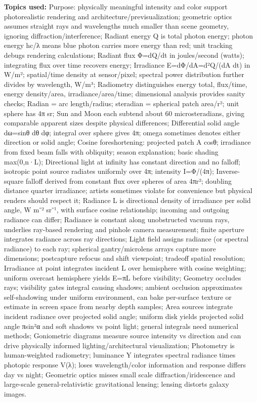 \textbf{Topics used:} Purpose: physically meaningful intensity and color support photorealistic rendering and architecture/previsualization; geometric optics assumes straight rays and wavelengths much smaller than scene geometry, ignoring diffraction/interference; Radiant energy Q is total photon energy; photon energy hc/λ means blue photon carries more energy than red; unit tracking debugs rendering calculations; Radiant flux Φ=dQ/dt in joules/second (watts); integrating flux over time recovers energy; Irradiance E=dΦ/dA=d²Q/(dA dt) in W/m²; spatial/time density at sensor/pixel; spectral power distribution further divides by wavelength, W/m³; Radiometry distinguishes energy total, flux/time, energy density/area, irradiance/area/time; dimensional analysis provides sanity checks; Radian = arc length/radius; steradian = spherical patch area/r²; unit sphere has 4π sr; Sun and Moon each subtend about 60 microsteradians, giving comparable apparent sizes despite physical differences; Differential solid angle dω=sinθ dθ dφ; integral over sphere gives 4π; omega sometimes denotes either direction or solid angle; Cosine foreshortening: projected patch A cosθ; irradiance from fixed beam falls with obliquity; season explanation; basic shading max(0,n·L); Directional light at infinity has constant direction and no falloff; isotropic point source radiates uniformly over 4π; intensity I=Φ/(4π); Inverse-square falloff derived from constant flux over spheres of area 4πr²; doubling distance quarter irradiance; artists sometimes violate for convenience but physical renders should respect it; Radiance L is directional density of irradiance per solid angle, W m⁻² sr⁻¹, with surface cosine relationship; incoming and outgoing radiance can differ; Radiance is constant along unobstructed vacuum rays, underlies ray-based rendering and pinhole camera measurement; finite aperture integrates radiance across ray directions; Light field assigns radiance (or spectral radiance) to each ray; spherical gantry/microlens arrays capture more dimensions; postcapture refocus and shift viewpoint; tradeoff spatial resolution; Irradiance at point integrates incident L over hemisphere with cosine weighting; uniform overcast hemisphere yields E=πL before visibility; Geometry occludes rays; visibility gates integral causing shadows; ambient occlusion approximates self-shadowing under uniform environment, can bake per-surface texture or estimate in screen space from nearby depth samples; Area sources integrate incident radiance over projected solid angle; uniform disk yields projected solid angle πsin²α and soft shadows vs point light; general integrals need numerical methods; Goniometric diagrams measure source intensity vs direction and can drive physically informed lighting/architectural visualization; Photometry is human-weighted radiometry; luminance Y integrates spectral radiance times photopic response V(λ); loses wavelength/color information and response differs day vs night; Geometric optics misses small scale diffraction/iridescence and large-scale general-relativistic gravitational lensing; lensing distorts galaxy images.

